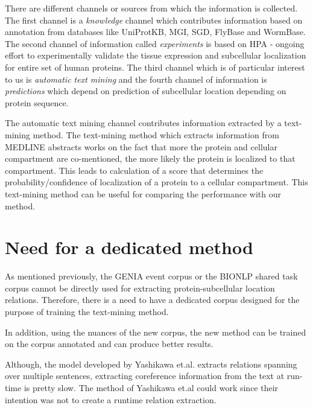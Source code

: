 There are different channels or sources from which the information is collected. The first channel is a \textit{knowledge} channel which contributes information based on annotation from databases like UniProtKB, MGI, SGD, FlyBase and WormBase. The second channel of information called \textit{experiments} is based on HPA - ongoing effort to experimentally validate  the tissue expression and subcellular localization for entire set of human proteins. The third channel which is of particular interest to us is \textit{automatic text mining} and the fourth channel of information is \textit{predictions} which depend on prediction of subcellular location depending on protein sequence.

The automatic text mining channel contributes information extracted by a text-mining method. The text-mining method which extracts information from MEDLINE abstracts works on the fact that more the protein and cellular compartment are co-mentioned, the more likely the protein is localized to that compartment. This leads to calculation of a score that determines the probability/confidence of localization of a protein to a cellular compartment. This text-mining method can be useful for comparing the performance with our method.

\section{Need for a dedicated method}
%

As mentioned previously, the GENIA event corpus or the BIONLP shared task corpus cannot be directly used for extracting protein-subcellular location relations. Therefore, there is a need to have a dedicated corpus designed for the purpose of training the text-mining method.

In addition, using the nuances of the new corpus, the new method can be trained on the corpus annotated and can produce better results.

Although, the model developed by Yashikawa et.al. extracts relations spanning over multiple sentences, extracting coreference information from the text at run-time is pretty slow. The method of Yashikawa et.al could work since their intention was not to create a runtime relation extraction.

